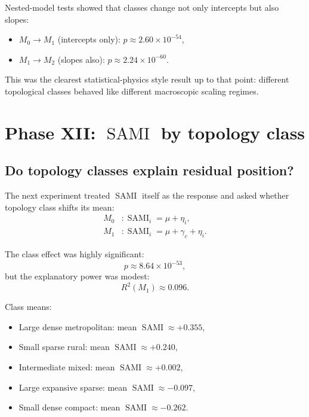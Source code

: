 \documentclass[11pt]{article}
\newcommand{\SAMI}{\operatorname{SAMI}}
\begin{document}
Nested-model tests showed that classes change not only intercepts but also slopes:
\begin{itemize}
\item \(M_0 \to M_1\) (intercepts only): \(p \approx 2.60\times 10^{-54}\),
\item \(M_1 \to M_2\) (slopes also): \(p \approx 2.24\times 10^{-60}\).
\end{itemize}

This was the clearest statistical-physics style result up to that point: different topological classes behaved like different macroscopic scaling regimes.

\section{Phase XII: \(\SAMI\) by topology class}

\subsection{Do topology classes explain residual position?}

The next experiment treated \(\SAMI\) itself as the response and asked whether topology class shifts its mean:
\begin{align}
M_0 &: \SAMI_i = \mu + \eta_i,\\
M_1 &: \SAMI_i = \mu + \gamma_c + \eta_i.
\end{align}

The class effect was highly significant:
\begin{equation}
p \approx 8.64\times 10^{-53},
\end{equation}
but the explanatory power was modest:
\begin{equation}
R^2(M_1) \approx 0.096.
\end{equation}

Class means:
\begin{itemize}
\item Large dense metropolitan: mean \(\SAMI \approx +0.355\),
\item Small sparse rural: mean \(\SAMI \approx +0.240\),
\item Intermediate mixed: mean \(\SAMI \approx +0.002\),
\item Large expansive sparse: mean \(\SAMI \approx -0.097\),
\item Small dense compact: mean \(\SAMI \approx -0.262\).
\end{itemize}
\end{document}
